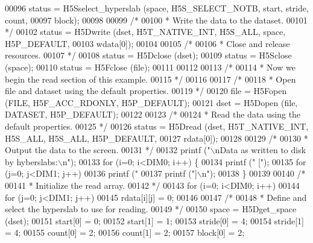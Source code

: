 \begin{DoxyCode}
{00096     status = H5Sselect\_hyperslab (space, H5S\_SELECT\_NOTB, start, stride, count,
00097                 block);
00098 
00099     \textcolor{comment}{/*}
00100 \textcolor{comment}{     * Write the data to the dataset.}
00101 \textcolor{comment}{     */}
00102     status = H5Dwrite (dset, H5T\_NATIVE\_INT, H5S\_ALL, space, H5P\_DEFAULT,
00103                 wdata[0]);
00104 
00105     \textcolor{comment}{/*}
00106 \textcolor{comment}{     * Close and release resources.}
00107 \textcolor{comment}{     */}
00108     status = H5Dclose (dset);
00109     status = H5Sclose (space);
00110     status = H5Fclose (file);
00111 
00112 
00113     \textcolor{comment}{/*}
00114 \textcolor{comment}{     * Now we begin the read section of this example.}
00115 \textcolor{comment}{     */}
00116 
00117     \textcolor{comment}{/*}
00118 \textcolor{comment}{     * Open file and dataset using the default properties.}
00119 \textcolor{comment}{     */}
00120     file = H5Fopen (FILE, H5F\_ACC\_RDONLY, H5P\_DEFAULT);
00121     dset = H5Dopen (file, DATASET, H5P\_DEFAULT);
00122 
00123     \textcolor{comment}{/*}
00124 \textcolor{comment}{     * Read the data using the default properties.}
00125 \textcolor{comment}{     */}
00126     status = H5Dread (dset, H5T\_NATIVE\_INT, H5S\_ALL, H5S\_ALL, H5P\_DEFAULT,
00127                 rdata[0]);
00128 
00129     \textcolor{comment}{/*}
00130 \textcolor{comment}{     * Output the data to the screen.}
00131 \textcolor{comment}{     */}
00132     printf (\textcolor{stringliteral}{"\(\backslash\)nData as written to disk by hyberslabs:\(\backslash\)n"});
00133     \textcolor{keywordflow}{for} (i=0; i<DIM0; i++) \{
00134         printf (\textcolor{stringliteral}{" ["});
00135         \textcolor{keywordflow}{for} (j=0; j<DIM1; j++)
00136             printf (\textcolor{stringliteral}{" %
00137         printf (\textcolor{stringliteral}{"]\(\backslash\)n"});
00138     \}
00139 
00140     \textcolor{comment}{/*}
00141 \textcolor{comment}{     * Initialize the read array.}
00142 \textcolor{comment}{     */}
00143     \textcolor{keywordflow}{for} (i=0; i<DIM0; i++)
00144         \textcolor{keywordflow}{for} (j=0; j<DIM1; j++)
00145             rdata[i][j] = 0;
00146 
00147     \textcolor{comment}{/*}
00148 \textcolor{comment}{     * Define and select the hyperslab to use for reading.}
00149 \textcolor{comment}{     */}
00150     space = H5Dget\_space (dset);
00151     start[0] = 0;
00152     start[1] = 1;
00153     stride[0] = 4;
00154     stride[1] = 4;
00155     count[0] = 2;
00156     count[1] = 2;
00157     block[0] = 2;
}}
\end{DoxyCode}
